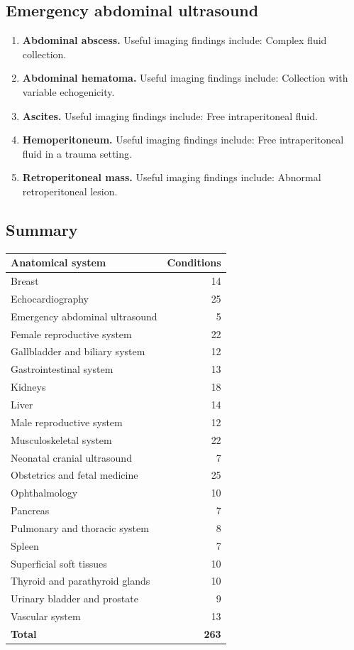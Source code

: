 \subsection{Emergency abdominal ultrasound}
\begin{enumerate}[leftmargin=*,itemsep=0.45em,topsep=0.4em]
\item \textbf{Abdominal abscess.} Useful imaging findings include: Complex fluid collection.
\item \textbf{Abdominal hematoma.} Useful imaging findings include: Collection with variable echogenicity.
\item \textbf{Ascites.} Useful imaging findings include: Free intraperitoneal fluid.
\item \textbf{Hemoperitoneum.} Useful imaging findings include: Free intraperitoneal fluid in a trauma setting.
\item \textbf{Retroperitoneal mass.} Useful imaging findings include: Abnormal retroperitoneal lesion.
\end{enumerate}

\subsection{Summary}
\begin{center}
\begin{tabular}{@{}lr@{}}
\toprule
\textbf{Anatomical system} & \textbf{Conditions} \\
\midrule
Breast & 14 \\
Echocardiography & 25 \\
Emergency abdominal ultrasound & 5 \\
Female reproductive system & 22 \\
Gallbladder and biliary system & 12 \\
Gastrointestinal system & 13 \\
Kidneys & 18 \\
Liver & 14 \\
Male reproductive system & 12 \\
Musculoskeletal system & 22 \\
Neonatal cranial ultrasound & 7 \\
Obstetrics and fetal medicine & 25 \\
Ophthalmology & 10 \\
Pancreas & 7 \\
Pulmonary and thoracic system & 8 \\
Spleen & 7 \\
Superficial soft tissues & 10 \\
Thyroid and parathyroid glands & 10 \\
Urinary bladder and prostate & 9 \\
\midrule
Vascular system & 13 \\
\midrule
\textbf{Total} & \textbf{263} \\
\bottomrule
\end{tabular}
\end{center}

